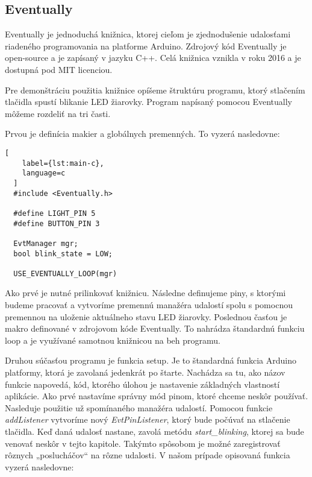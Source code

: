 \subsection{Eventually}
\noindent \par
Eventually \cite{bartlettEventually2021} je jednoduchá knižnica, ktorej cieľom je zjednodušenie udalosťami riadeného
programovania na platforme Arduino. Zdrojový kód Eventually je open-source a je zapísaný v jazyku C++. Celá knižnica vznikla v roku 2016 a je dostupná pod \acrshort{MIT} licenciou.
\par Pre demonštráciu použitia knižnice opíšeme štruktúru programu, ktorý stlačením tlačidla spustí blikanie LED žiarovky. Program napísaný pomocou Eventually môžeme rozdeliť na tri časti.

\par Prvou je definícia makier a globálnych premenných. To vyzerá nasledovne:
\begin{lstlisting}[
    label={lst:main-c},
    language=c
  ]  
  #include <Eventually.h>

  #define LIGHT_PIN 5
  #define BUTTON_PIN 3
  
  EvtManager mgr;
  bool blink_state = LOW;

  USE_EVENTUALLY_LOOP(mgr)
\end{lstlisting}

Ako prvé je nutné prilinkovať knižnicu. Následne definujeme piny, s ktorými budeme pracovať a vytvoríme premennú manažéra udalostí spolu s pomocnou premennou na uloženie aktuálneho stavu LED žiarovky. Poslednou časťou je makro definované v zdrojovom kóde Eventually. To nahrádza štandardnú funkciu loop a je využívané samotnou knižnicou na beh programu.

\par Druhou súčasťou programu je funkcia setup. Je to štandardná funkcia Arduino platformy, ktorá je zavolaná
jedenkrát po štarte. Nachádza sa tu, ako názov funkcie napovedá, kód, ktorého úlohou je
nastavenie základných vlastností aplikácie. Ako prvé nastavíme správny mód pinom, ktoré chceme neskôr používať. Nasleduje použitie už
spomínaného manažéra udalostí. Pomocou funkcie \textit{addListener} vytvoríme nový \textit{EvtPinListener}, ktorý bude počúvať na stlačenie tlačidla.
Keď daná udalosť nastane, zavolá metódu \textit{start\_blinking}, ktorej sa bude venovať neskôr v tejto kapitole.
Takýmto spôsobom je možné zaregistrovať rôznych  „poslucháčov“  na rôzne udalosti. V našom prípade opisovaná funkcia vyzerá nasledovne:

